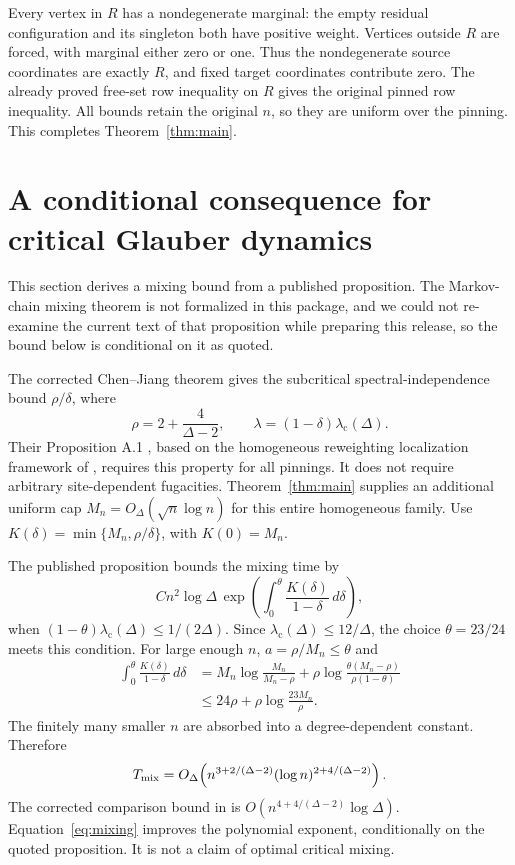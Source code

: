 \documentclass[11pt]{article}
\theoremstyle{definition}
\newcommand{\lamc}{\lambda_{\mathrm c}}
\begin{document}
Every vertex in $R$ has a nondegenerate marginal: the empty residual
configuration and its singleton both have positive weight. Vertices outside
$R$ are forced, with marginal either zero or one. Thus the nondegenerate
source coordinates are exactly $R$, and fixed target coordinates contribute
zero. The already proved free-set row inequality on $R$ gives the original
pinned row inequality. All bounds retain the original $n$, so they are
uniform over the pinning. This completes Theorem~\ref{thm:main}.

\section{A conditional consequence for critical Glauber dynamics}

This section derives a mixing bound from a published proposition. The
Markov-chain mixing theorem is not formalized in this package, and we could
not re-examine the current text of that proposition while preparing this
release, so the bound below is conditional on it as quoted.

The corrected Chen--Jiang theorem gives the subcritical spectral-independence
bound $\rho/\delta$, where
\[
 \rho=2+\frac4{\Delta-2},\qquad \lambda=(1-\delta)\lamc(\Delta).
\]
Their Proposition A.1 \cite{CJ26}, based on the homogeneous reweighting
localization framework of \cite{CCYZ}, requires this property for all
pinnings. It does not require arbitrary site-dependent fugacities.
Theorem~\ref{thm:main} supplies an additional uniform cap
$M_n=O_\Delta(\sqrt n\log n)$ for this entire homogeneous family.
Use $K(\delta)=\min\{M_n,\rho/\delta\}$, with $K(0)=M_n$.

The published proposition bounds the mixing time by
\[
 Cn^2\log\Delta\,
 \exp\left(\int_0^\theta\frac{K(\delta)}{1-\delta}\,d\delta\right),
\]
when $(1-\theta)\lamc(\Delta)\le1/(2\Delta)$.
Since $\lamc(\Delta)\le12/\Delta$, the choice $\theta=23/24$ meets this
condition. For large enough $n$, $a=\rho/M_n\le\theta$ and
\begin{align*}
 \int_0^\theta\frac{K(\delta)}{1-\delta}\,d\delta
 &=M_n\log\frac{M_n}{M_n-\rho}
   +\rho\log\frac{\theta(M_n-\rho)}{\rho(1-\theta)}\\
 &\le24\rho+\rho\log\frac{23M_n}{\rho}.
\end{align*}
The finitely many smaller $n$ are absorbed into a degree-dependent constant.
Therefore
\begin{equation}\label{eq:mixing}
 T_{\rm mix}
 =O_\Delta\!\left(
 n^{3+2/(\Delta-2)}(\log n)^{2+4/(\Delta-2)}\right).
\end{equation}
The corrected comparison bound in \cite{CJ26} is
$O(n^{4+4/(\Delta-2)}\log\Delta)$. Equation~\eqref{eq:mixing} improves the
polynomial exponent, conditionally on the quoted proposition. It is not a
claim of optimal critical mixing.
\end{document}
